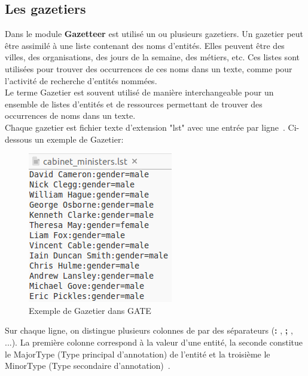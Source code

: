 \documentclass[a4paper, 11pt]{report}
\begin{document}
\subsection{Les gazetiers}
Dans le module \textbf{Gazetteer} est utilisé un ou plusieurs gazetiers. Un gazetier peut être assimilé à une liste contenant des noms d'entités. Elles peuvent être des villes, des organisations, des jours de la semaine, des métiers, etc. Ces listes sont utilisées pour trouver des occurrences de ces noms dans un texte, comme pour l'activité de recherche d'entités nommées.\\
Le terme Gazetier est souvent utilisé de manière interchangeable pour un ensemble de listes d'entités et de ressources permettant de trouver des occurrences de noms dans un texte.\\
Chaque gazetier est fichier texte d'extension "lst" avec une entrée par ligne~\cite{w4gaz}.
Ci-dessous un exemple de Gazetier:
\begin{figure}[H]
\begin{center}
\includegraphics[scale=0.5]{img/exGazetier.png}
\end{center}
\caption{Exemple de Gazetier dans GATE}
\end{figure}
Sur chaque ligne, on distingue plusieurs colonnes de par des séparateurs (\textbf{:} , \textbf{;} , ...). La première colonne correspond à la valeur d'une entité, la seconde constitue le MajorType (Type principal d'annotation) de l'entité et la troisième le MinorType (Type secondaire d'annotation)~\cite{w4gaz}.
\end{document}
